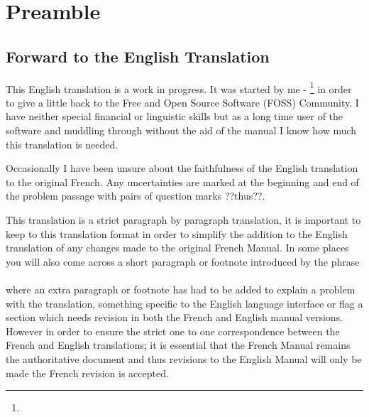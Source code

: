 \chapter{Preamble \label{preamble}}


\section*{Forward to the English Translation}
This English translation is a work in progress.  It was started by me - \footnote{\urlBob{}} in order to give a little back to the Free and Open Source Software (FOSS) Community.  I have neither special financial or linguistic skills but as a long time user of the software and muddling through without the aid of the manual I know how much this translation is needed.

Occasionally I have been unsure about the faithfulness of the English translation to the original French.  Any uncertainties are marked at the beginning and end of the problem passage with pairs of question marks ??thus??.

This translation is a strict paragraph by paragraph  translation, it is important to keep to this translation format in order to simplify the addition to the English translation of any changes made to the original French Manual.  In some places you will also come across a short paragraph or footnote introduced by the phrase \\
 \\
where an extra paragraph or footnote has had to be added to explain a problem with the translation, something specific to the English language interface or flag a section which needs revision in both the French and English manual versions.  However in order to ensure the strict one to one correspondence between the French and English translations; it is essential that the French Manual remains the authoritative document and thus revisions to the English Manual will only be made  the French revision is accepted.

